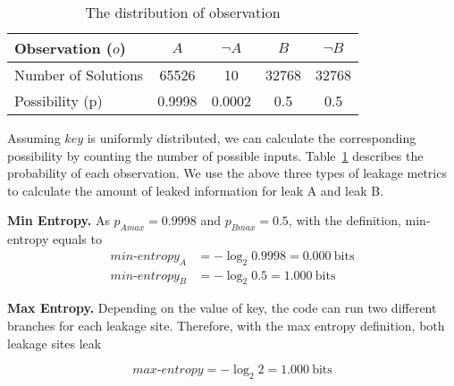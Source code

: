 \begin{table}[ht]
    \centering\small\footnotesize
    \caption{The distribution of observation}\label{shtable}
    \vspace*{-0pt}
    \begin{tabular}{l|cc|cc}
        \hline

        Observation ($o$)   & $A$ & $\neg A$ & $B$ & $\neg B$ \\ \hline
        Number of Solutions & 65526       & 10        & 32768     & 32768           \\ \hline
        Possibility (p)     & 0.9998      & 0.0002    & 0.5    & 0.5       \\
        \hline
    \end{tabular}
\end{table}

Assuming $\mathit{key}$ is uniformly distributed, we can calculate the corresponding
possibility by counting the number of possible inputs. Table~\ref{shtable}
describes the probability of each observation. We use the above three types of 
leakage metrics to calculate the amount of leaked information for leak A and leak B.

\vspace{3pt}
\textbf{Min Entropy.}
As $p_{A\mathit{max}} = 0.9998$ and $p_{B\mathit{max}} = 0.5$, 
with the definition, min-entropy equals to
\begin{align*}
    \mathit{min\text{-}entropy_A} & = -\log_2{0.9998} = 0.000\ \mathrm{bits} \\
    \mathit{min\text{-}entropy_B} & = -\log_2{0.5} = 1.000\ \mathrm{bits}
\end{align*}

\textbf{Max Entropy.}
Depending on the value of key, the code can run two different branches for each leakage site. 
Therefore, with the max entropy
definition, both leakage sites leak

\begin{displaymath}
    \mathit{max\text{-}entropy} = -\log_2{2} = 1.000\ \mathrm{bits}
\end{displaymath}

